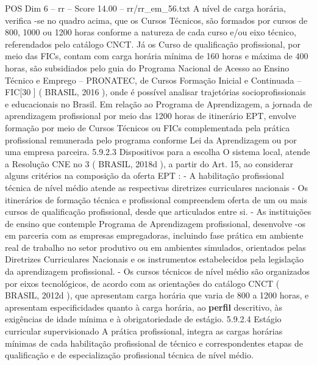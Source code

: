 \begin{textsample}{POS Dim 6 – rr – Score 14.00 – rr/rr\_em\_56.txt}  \label{ex:f6_pos_211}
A nível de carga horária, verifica -se no quadro acima, que os Cursos Técnicos, são formados por cursos de 800, 1000 ou 1200 horas conforme a natureza de cada curso e/ou eixo técnico, referendados pelo catálogo CNCT.
Já os Curso de qualificação profissional, por meio das FICs, contam com carga horária mínima de 160 horas e máxima de 400 horas, são subsidiados pelo guia do Programa Nacional de Acesso ao Ensino Técnico e Emprego – PRONATEC, de Cursos Formação Inicial e Continuada – FIC[30 ] ( BRASIL, 2016 ), onde é possível analisar trajetórias socioprofissionais e educacionais no Brasil.
Em relação ao Programa de Aprendizagem, a jornada de aprendizagem profissional por meio das 1200 horas de itinerário EPT, envolve formação por meio de Cursos Técnicos ou FICs complementada pela prática profissional remunerada pelo programa conforme Lei da Aprendizagem ou por uma empresa parceira. 5.9.2.3 Dispositivos para a escolha O sistema local, atende a Resolução CNE no 3 ( BRASIL, 2018d ), a partir do Art. 15, ao considerar alguns critérios na composição da oferta EPT : - A habilitação profissional técnica de nível médio atende as respectivas diretrizes curriculares nacionais - Os itinerários de formação técnica e profissional compreendem oferta de um ou mais cursos de qualificação profissional, desde que articulados entre si. - As instituições de ensino que contemple Programa de Aprendizagem profissional, desenvolve -os em parceria com as empresas empregadoras, incluindo fase prática em ambiente real de trabalho no setor produtivo ou em ambientes simulados, orientados pelas Diretrizes Curriculares Nacionais e os instrumentos estabelecidos pela legislação da aprendizagem profissional. - Os cursos técnicos de nível médio são organizados por eixos tecnológicos, de acordo com as orientações do catálogo CNCT ( BRASIL, 2012d ), que apresentam carga horária que varia de 800 a 1200 horas, e apresentam especificidades quanto à carga horária, ao \textbf{perfil} descritivo, às exigências de idade mínima e à obrigatoriedade de estágio. 5.9.2.4 Estágio curricular supervisionado A prática profissional, integra as cargas horárias mínimas de cada habilitação profissional de técnico e correspondentes etapas de qualificação e de especialização profissional técnica de nível médio.

\end{textsample}
